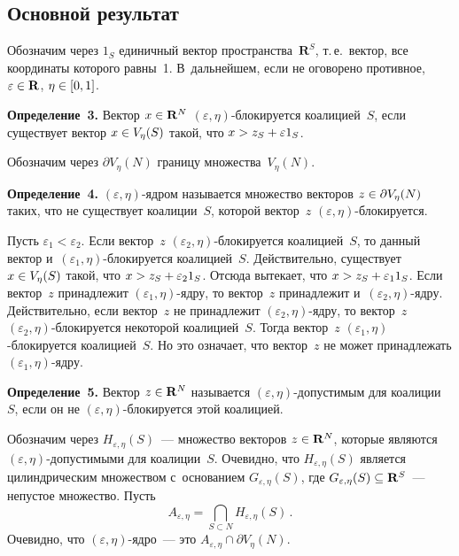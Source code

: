 \begin{multicols}{2}
\section{Основной результат}

\vspace*{-2pt}

    Обозначим  через $1_S$ единичный вектор 
пространства~$\mathbf{R}^S$, т.\,е.\ вектор, все координаты которого равны~1. 
В~дальнейшем, если не оговорено противное, $\varepsilon\hm\in \mathbf{R}$, 
$\eta\hm\in [0,1]$. 

        \smallskip
     
    \noindent
\textbf{Определение~3.} Вектор $x\hm\in \mathbf{R}^N$ 
$(\varepsilon,\eta)$-бло\-ки\-ру\-ет\-ся коалицией~$S$, если существует вектор 
$x\hm\in V_\eta(S)$ такой, что $x\hm> z_S\hm+ \varepsilon 1_S$.

     \smallskip

Обозначим через $\partial V_\eta(N)$ границу множества~$V_\eta(N)$.

     \smallskip
     
    \noindent
\textbf{Определение~4.} $(\varepsilon,\eta)$-яд\-ром называется множество 
векторов $z\hm\in \partial V_\eta(N)$ таких, что не существует коалиции~$S$, 
которой вектор~$z$ $(\varepsilon,\eta)$-бло\-ки\-ру\-ется. 
    
Пусть $\varepsilon_1<\varepsilon_2$. Если вектор~$z$  
$(\varepsilon_2,\eta)$-бло\-ки\-ру\-ет\-ся коалицией~$S$, то данный вектор 
и~$(\varepsilon_1,\eta)$-бло\-ки\-ру\-ет\-ся коалицией~$S$. Действительно, существует $x\hm\in 
V_\eta(S)$ такой, что $x\hm > z_S\hm+ \varepsilon_2 1_S$. Отсюда вытекает, что 
$x\hm> z_S\hm+ \varepsilon_1 1_S$. Если вектор~$z$ принадлежит  
$(\varepsilon_1,\eta)$-яд\-ру, то вектор~$z$ принадлежит  
и~$(\varepsilon_2,\eta)$-яд\-ру. Действительно, если вектор~$z$ не принадлежит 
$(\varepsilon_2,\eta)$-яд\-ру, то вектор~$z$  
$(\varepsilon_2,\eta)$-бло\-ки\-ру\-ет\-ся некоторой коалицией~$S$. Тогда 
вектор~$z$ $(\varepsilon_1,\eta)$-бло\-ки\-ру\-ет\-ся коалицией~$S$. Но это 
означает, что вектор~$z$ не может принадлежать $(\varepsilon_1,\eta)$-ядру.

     \smallskip
     
    \noindent
\textbf{Определение~5.} Вектор $z\hm\in \mathbf{R}^N$ называется 
$(\varepsilon,\eta)$-до\-пус\-ти\-мым для коалиции~$S$, если он не  
$(\varepsilon,\eta)$-бло\-ки\-ру\-ет\-ся этой коалицией.
    
Обозначим через $H_{\varepsilon,\eta}(S)$~--- множество векторов $z\hm\in 
\mathbf{R}^N$, которые являются  
$(\varepsilon,\eta)$-до\-пус\-ти\-мы\-ми для коалиции~$S$. Очевидно, что 
$H_{\varepsilon,\eta}(S)$ является цилиндрическим множеством с~основанием 
$G_{\varepsilon,\eta}(S)$, где $ G_{\varepsilon,\eta}(S) \hm\subseteq 
\mathbf{R}^S$~--- непустое множество. Пусть
$$
A_{\varepsilon,\eta} = \mathop{\bigcap}\limits_{S\subset N} H_{\varepsilon,\eta} (S)\,.
$$
Очевидно, что $(\varepsilon,\eta)$-яд\-ро~--- это $A_{\varepsilon,\eta} \cap 
\partial V_\eta(N)$.
    

\end{multicols}
